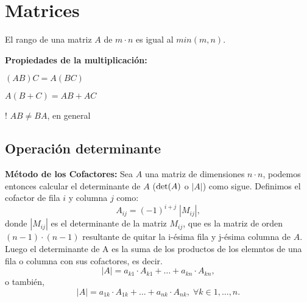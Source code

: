 


\section{Matrices}
\begin{definition}
    El rango de una matriz $A$ de $m \cdot n$ es igual al $min(m, n)$.
\end{definition}
\textbf{Propiedades de la multiplicación:}
\begin{bangenumerate}
    \item $(AB)C = A(BC)$
    \item $A(B+C)= AB + AC$
    \item! $AB \neq BA$, en general
\end{bangenumerate}
\subsection{Operación determinante}
\begin{definition}
    \textbf{Método de los Cofactores:} Sea $A$ una matriz de dimensiones $n \cdot n$, 
    podemos entonces calcular el determinante de $A$ ($\determinant(A)$ o $|A|$) como sigue.
    Definimos el cofactor de fila $i$ y columna $j$ como:
    \begin{equation*}
        A_{ij} = (-1)^{i+j} \; |M_{ij}|,
    \end{equation*}
    donde $|M_{ij}|$ es el determinante de la matriz $M_{ij}$, que es la matriz de orden $(n-1)\cdot(n-1)$ resultante
    de quitar la i-ésima fila y j-ésima columna de $A$. Luego el determinante de A es la suma de los productos de los
    elemntos de una fila o columna con sus cofactores, es decir.
    \begin{equation*}
        |A| = a_{k1} \cdot A_{k1} + \dots + a_{kn} \cdot A_{kn},
    \end{equation*}
    o también,
    \begin{equation*}
        |A| = a_{1k} \cdot A_{1k} + \dots + a_{nk}\cdot A_{nk}, \; \forall k \in {1, \dots, n}.
    \end{equation*}
\end{definition}

